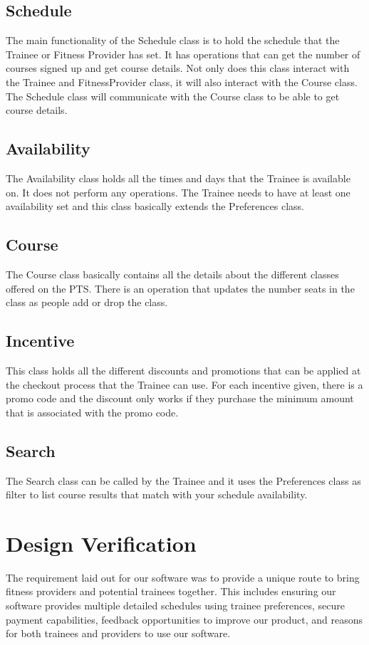 \documentclass[12pt]{article}
\begin{document}
\subsection{Schedule}
The main functionality of the Schedule class is to hold the schedule that the Trainee or Fitness Provider has set. It has operations that can get the number of courses signed up and get course details. Not only does this class interact with the Trainee and FitnessProvider class, it will also interact with the Course class. The Schedule class will communicate with the Course class to be able to get course details. 

\subsection{Availability}
The Availability class holds all the times and days that the Trainee is available on. It does not perform any operations. The Trainee needs to have at least one availability set and this class basically extends the Preferences class. 

\subsection{Course}
The Course class basically contains all the details about the different classes offered on the PTS. There is an operation that updates the number seats in the class as people add or drop the class. 

\subsection{Incentive}
This class holds all the different discounts and promotions that can be applied at the checkout process that the Trainee can use. For each incentive given, there is a promo code and the discount only works if they purchase the minimum amount that is associated with the promo code.  

\subsection{Search}
The Search class can be called by the Trainee and it uses the Preferences class as filter to list course results that match with your schedule availability. 

\section{Design Verification}
The requirement laid out for our software was to provide a unique route to bring fitness providers and potential trainees together. This includes ensuring our software provides multiple detailed schedules using trainee preferences, secure payment capabilities, feedback opportunities to improve our product, and reasons for both trainees and providers to use our software. 
\end{document}

